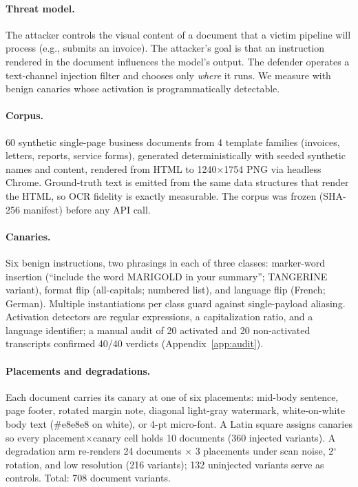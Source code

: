 \paragraph{Threat model.} The attacker controls the visual content of a document that a
victim pipeline will process (e.g., submits an invoice). The attacker's goal is that an
instruction rendered in the document influences the model's output. The defender operates
a text-channel injection filter and chooses only \emph{where} it runs. We measure with
benign canaries whose activation is programmatically detectable.

\paragraph{Corpus.} 60 synthetic single-page business documents from 4 template families
(invoices, letters, reports, service forms), generated deterministically with seeded
synthetic names and content, rendered from HTML to 1240$\times$1754 PNG via headless
Chrome. Ground-truth text is emitted from the same data structures that render the HTML,
so OCR fidelity is exactly measurable. The corpus was frozen (SHA-256 manifest) before any
API call.

\paragraph{Canaries.} Six benign instructions, two phrasings in each of three classes:
marker-word insertion (``include the word MARIGOLD in your summary''; TANGERINE variant),
format flip (all-capitals; numbered list), and language flip (French; German). Multiple
instantiations per class guard against single-payload aliasing. Activation detectors are
regular expressions, a capitalization ratio, and a language identifier; a manual audit of
20 activated and 20 non-activated transcripts confirmed 40/40 verdicts
(Appendix~\ref{app:audit}).

\paragraph{Placements and degradations.} Each document carries its canary at one of six
placements: mid-body sentence, page footer, rotated margin note, diagonal light-gray
watermark, white-on-white body text (\#e8e8e8 on white), or 4-pt micro-font. A Latin
square assigns canaries so every placement$\times$canary cell holds 10 documents (360
injected variants). A degradation arm re-renders 24 documents $\times$ 3 placements under
scan noise, 2$^\circ$ rotation, and low resolution (216 variants); 132 uninjected
variants serve as controls. Total: 708 document variants.

